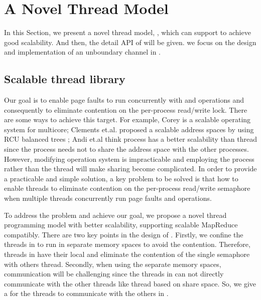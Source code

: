 \section{A Novel Thread Model}
\label{sec:design}
In this Section, we present a novel thread model, \myth, which can support \myds to achieve good scalability.
And then, the detail API of \myth will be given.
we focus on the design and implementation of an unboundary channel in \myth.


\subsection{Scalable thread library}
Our goal is to enable page faults to run concurrently with  and  operations and consequently to eliminate contention on the per-process read/write lock.
There are some ways to achieve this target. 
For example, Corey\cite{boyd2008corey} is a scalable operating system for multicore;
Clements et.al. proposed a scalable address spaces by using RCU balanced trees \cite{clements2012concurrent};
Andi et.al think process has a better scalability than thread since the process needs not to share the address space with the other processes\cite{Andi2009lmulticore}.
However, modifying operation system is impracticable and employing the process rather than the thread will make sharing become complicated. 
In order to provide a practicable and simple solution, a key problem to be solved is that how to enable threads to eliminate contention on the per-process read/write semaphore when multiple threads concurrently run page faults and  operations.


To address the problem and achieve our goal, we propose a novel thread programming model \myth with better scalability, supporting scalable MapReduce compatibly.
There are two key points in the design of \myth.
Firstly, we confine the threads in \myth to run in separate memory spaces to avoid the contention.
Therefore, threads in \myth have their local  and eliminate the contention of the single semaphore with others thread.
Secondly, when using the separate memory spaces, communication will be challenging since the threads in \myth can not directly communicate with the other threads like thread based on share space.
So, we give a \chan for the threads to communicate with the others in \myth. 



